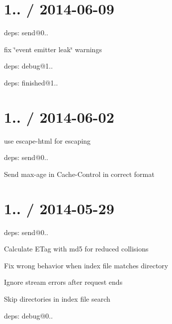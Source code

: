 \section*{1.. / 2014-\/06-\/09 }


\begin{DoxyItemize}
\item deps\+: send@0..
\begin{DoxyItemize}
\item fix \char`\"{}event emitter leak\char`\"{} warnings
\item deps\+: debug@1..
\item deps\+: finished@1..
\end{DoxyItemize}
\end{DoxyItemize}

\section*{1.. / 2014-\/06-\/02 }


\begin{DoxyItemize}
\item use {\ttfamily escape-\/html} for escaping
\item deps\+: send@0..
\begin{DoxyItemize}
\item Send {\ttfamily max-\/age} in {\ttfamily Cache-\/\+Control} in correct format
\end{DoxyItemize}
\end{DoxyItemize}

\section*{1.. / 2014-\/05-\/29 }


\begin{DoxyItemize}
\item deps\+: send@0..
\begin{DoxyItemize}
\item Calculate E\+Tag with md5 for reduced collisions
\item Fix wrong behavior when index file matches directory
\item Ignore stream errors after request ends
\item Skip directories in index file search
\item deps\+: debug@0..
\end{DoxyItemize}
\end{DoxyItemize}

